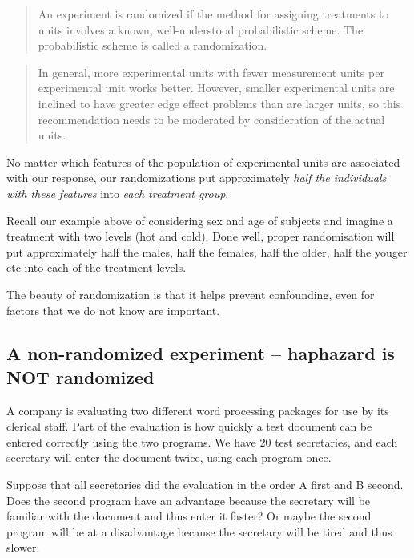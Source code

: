 \documentclass[
]{book}
\begin{document}
\begin{quote}
An experiment is randomized if the method for assigning treatments to units involves a known, well-understood probabilistic scheme. The probabilistic scheme is called a randomization.
\end{quote}

\begin{quote}
In general, more experimental units with fewer measurement units per experimental unit works better. However, smaller experimental units are inclined to have greater edge effect problems than are larger units, so this recommendation needs to be moderated by consideration of the actual units.
\end{quote}

No matter which features of the population of experimental units are associated with our response, our randomizations put approximately \emph{half the individuals with these features} into \emph{each treatment group}.

Recall our example above of considering sex and age of subjects and imagine a treatment with two levels (hot and cold). Done well, proper randomisation will put approximately half the males, half the females, half the older, half the youger etc into each of the treatment levels.

The beauty of randomization is that it helps prevent confounding, even for factors that we do not know are important.

\hypertarget{a-non-randomized-experiment-haphazard-is-not-randomized}{%
\subsection{\texorpdfstring{A non-randomized experiment -- \textbf{haphazard} is NOT randomized}{A non-randomized experiment -- haphazard is NOT randomized}}\label{a-non-randomized-experiment-haphazard-is-not-randomized}}

A company is evaluating two different word processing packages for use by its clerical staff. Part of the evaluation is how quickly a test document can be entered correctly using the two programs. We have 20 test secretaries, and each secretary will enter the document twice, using each program once.

Suppose that all secretaries did the evaluation in the order A first and B second. Does the second program have an advantage because the secretary will be familiar with the document and thus enter it faster? Or maybe the second program will be at a disadvantage because the secretary will be tired and thus slower.
\end{document}
